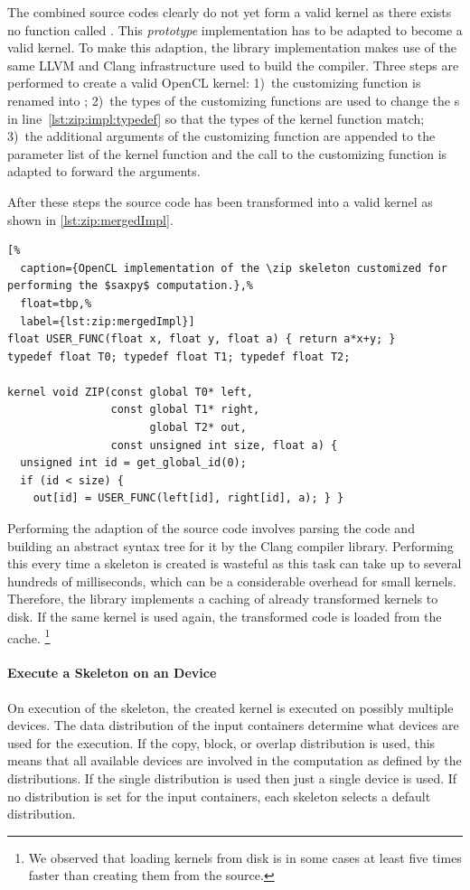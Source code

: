 The combined source codes clearly do not yet form a valid \OpenCL kernel as there exists no function called .
This \emph{prototype} implementation has to be adapted to become a valid \OpenCL kernel.
To make this adaption, the \SkelCL library implementation makes use of the same LLVM and Clang infrastructure used to build the  compiler.
Three steps are performed to create a valid OpenCL kernel:
1)~the customizing function is renamed into ;
2)~the types of the customizing functions are used to change the s in line~\ref{lst:zip:impl:typedef} so that the types of the kernel function  match;
3)~the additional arguments of the customizing function are appended to the parameter list of the kernel function  and the call to the customizing function is adapted to forward the arguments.

After these steps the source code has been transformed into a valid \OpenCL kernel as shown in \autoref{lst:zip:mergedImpl}.
\begin{lstlisting}[%
  caption={OpenCL implementation of the \zip skeleton customized for performing the $saxpy$ computation.},%
  float=tbp,%
  label={lst:zip:mergedImpl}]
float USER_FUNC(float x, float y, float a) { return a*x+y; }
typedef float T0; typedef float T1; typedef float T2;

kernel void ZIP(const global T0* left,
                const global T1* right,
                      global T2* out,
                const unsigned int size, float a) {
  unsigned int id = get_global_id(0);
  if (id < size) {
    out[id] = USER_FUNC(left[id], right[id], a); } }
\end{lstlisting}

Performing the adaption of the source code involves parsing the code and building an abstract syntax tree for it by the Clang compiler library.
Performing this every time a skeleton is created is wasteful as this task can take up to several hundreds of milliseconds, which can be a considerable overhead for small kernels.
Therefore, the \SkelCL library implements a caching of already transformed kernels to disk.
If the same kernel is used again, the transformed code is loaded from the cache.%
\footnote{We observed that loading kernels from disk is in some cases at least five times faster than creating them from the source.}


\paragraph{Execute a Skeleton on an \OpenCL Device}
On execution of the skeleton, the created \OpenCL kernel is executed on possibly multiple \OpenCL devices.
The data distribution of the input containers determine what \OpenCL devices are used for the execution.
If the copy, block, or overlap distribution is used, this means that all available devices are involved in the computation as defined by the distributions.
If the single distribution is used then just a single device is used.
If no distribution is set for the input containers, each skeleton selects a default distribution.

